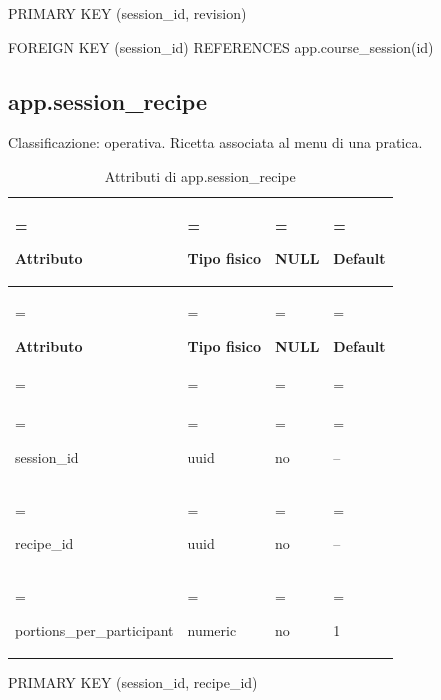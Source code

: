 \documentclass[11pt,a4paper]{article}
\begin{document}
{\ttfamily\small PRIMARY KEY (\allowbreak{}session\_\allowbreak{}id,\allowbreak{} revision)}\par

{\ttfamily\small FOREIGN KEY (\allowbreak{}session\_\allowbreak{}id) REFERENCES app.\allowbreak{}course\_\allowbreak{}session(\allowbreak{}id)}\par

\subsection{app.session\_recipe}

Classificazione: operativa. Ricetta associata al menu di una pratica.

{\small \renewcommand{\arraystretch}{1.2}

\begin{xltabular}{\linewidth}{>{\hsize\linewidth=\hsize\raggedright\arraybackslash}X>{\hsize\linewidth=\hsize\raggedright\arraybackslash}X>{\hsize\linewidth=\hsize\raggedright\arraybackslash}X>{\hsize\linewidth=\hsize\raggedright\arraybackslash}X}
\caption{Attributi di app.session\_recipe}\label{tab:dictionary-26}\\
\toprule

\textbf{Attributo} & \textbf{Tipo fisico} & \textbf{NULL} & \textbf{Default}\\\midrule\endfirsthead\toprule\textbf{Attributo} & \textbf{Tipo fisico} & \textbf{NULL} & \textbf{Default}\\\midrule\endhead
\midrule{}\\\endfoot\bottomrule\endlastfoot


{\ttfamily\small session\_\allowbreak{}id} & {\ttfamily\small uuid} & no & {\ttfamily\small --}\\\addlinespace[3pt]

{\ttfamily\small recipe\_\allowbreak{}id} & {\ttfamily\small uuid} & no & {\ttfamily\small --}\\\addlinespace[3pt]

{\ttfamily\small portions\_\allowbreak{}per\_\allowbreak{}participant} & {\ttfamily\small numeric} & no & {\ttfamily\small 1}\\*

\end{xltabular}}

{\ttfamily\small PRIMARY KEY (\allowbreak{}session\_\allowbreak{}id,\allowbreak{} recipe\_\allowbreak{}id)}\par
\end{document}
